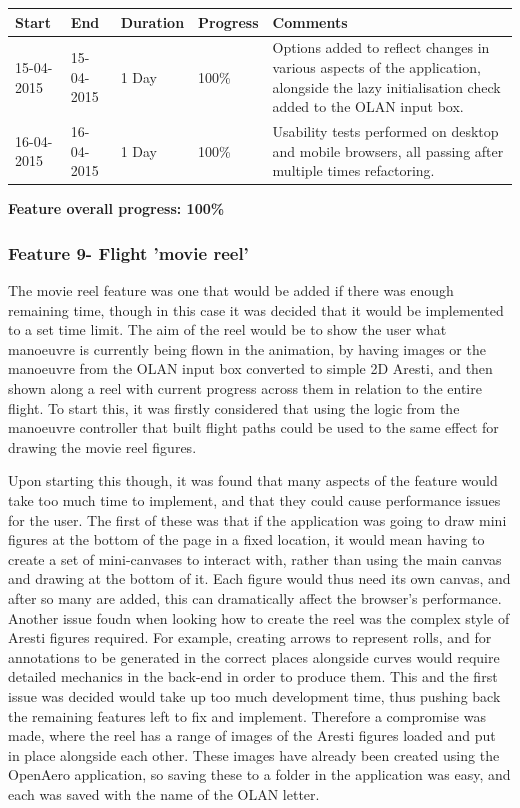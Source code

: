 \begin{table}[h]
\begin{tabular}{|l|l|l|l|p{7cm}|}
\hline
\textbf{Start} & \textbf{End} & \textbf{Duration} & \textbf{Progress} & \textbf{Comments}                                                                                                     \\ \hline
15-04-2015     & 15-04-2015   & 1 Day            & 100\%             &  Options added to reflect changes in various aspects of the application, alongside the lazy initialisation check added to the OLAN input box.\\ \hline
16-04-2015     & 16-04-2015   & 1 Day            & 100\%             &  Usability tests performed on desktop and mobile browsers, all passing after multiple times refactoring. \\ \hline
\end{tabular}
\end{table}

\textbf{Feature overall progress: 100\%}

\subsubsection{Feature 9- Flight 'movie reel'}
The movie reel feature was one that would be added if there was enough remaining time, though in this case it was decided that it would be implemented to a set time limit. The aim of the reel would be to show the user what manoeuvre is currently being flown in the animation, by having images or the manoeuvre from the OLAN input box converted to simple 2D Aresti, and then shown along a reel with current progress across them in relation to the entire flight. To start this, it was firstly considered that using the logic from the manoeuvre controller that built flight paths could be used to the same effect for drawing the movie reel figures. 

Upon starting this though, it was found that many aspects of the feature would take too much time to implement, and that they could cause performance issues for the user. The first of these was that if the application was going to draw mini figures at the bottom of the page in a fixed location, it would mean having to create a set of mini-canvases to interact with, rather than using the main canvas and drawing at the bottom of it. Each figure would thus need its own canvas, and after so many are added, this can dramatically affect the browser's performance. Another issue foudn when looking how to create the reel was the complex style of Aresti figures required. For example, creating arrows to represent rolls, and for annotations to be generated in the correct places alongside curves would require detailed mechanics in the back-end in order to produce them. This and the first issue was decided would take up too much development time, thus pushing back the remaining features left to fix and implement. Therefore a compromise was made, where the reel has a range of images of the Aresti figures loaded and put in place alongside each other. These images have already been created using the OpenAero application, so saving these to a folder in the application was easy, and each was saved with the name of the OLAN letter. 

